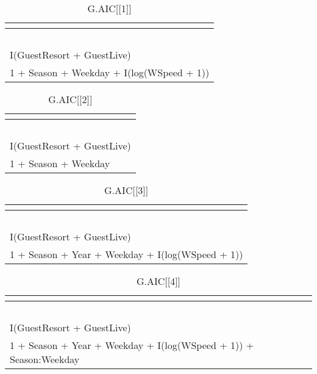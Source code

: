 %
\begin{table}[!tbp]
\caption{G.AIC[[1]]\label{G.AIC[[1]]}} 
\begin{center}
\begin{tabular}{l}
\hline\hline
\multicolumn{1}{c}{}\tabularnewline
\hline
~\tabularnewline
I(GuestResort + GuestLive)\tabularnewline
1 + Season + Weekday + I(log(WSpeed + 1))\tabularnewline
\hline
\end{tabular}
\end{center}
\end{table}

%
\begin{table}[!tbp]
\caption{G.AIC[[2]]\label{G.AIC[[2]]}} 
\begin{center}
\begin{tabular}{l}
\hline\hline
\multicolumn{1}{c}{}\tabularnewline
\hline
~\tabularnewline
I(GuestResort + GuestLive)\tabularnewline
1 + Season + Weekday\tabularnewline
\hline
\end{tabular}
\end{center}
\end{table}

%
\begin{table}[!tbp]
\caption{G.AIC[[3]]\label{G.AIC[[3]]}} 
\begin{center}
\begin{tabular}{l}
\hline\hline
\multicolumn{1}{c}{}\tabularnewline
\hline
~\tabularnewline
I(GuestResort + GuestLive)\tabularnewline
1 + Season + Year + Weekday + I(log(WSpeed + 1))\tabularnewline
\hline
\end{tabular}
\end{center}
\end{table}

%
\begin{table}[!tbp]
\caption{G.AIC[[4]]\label{G.AIC[[4]]}} 
\begin{center}
\begin{tabular}{l}
\hline\hline
\multicolumn{1}{c}{}\tabularnewline
\hline
~\tabularnewline
I(GuestResort + GuestLive)\tabularnewline
1 + Season + Year + Weekday + I(log(WSpeed + 1)) + Season:Weekday\tabularnewline
\hline
\end{tabular}
\end{center}
\end{table}

